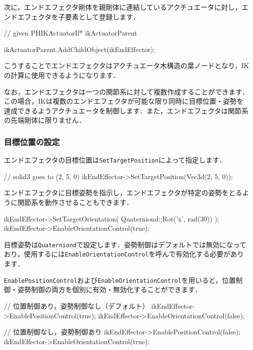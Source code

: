 \KLUDGE 次に，エンドエフェクタ剛体を親剛体に連結しているアクチュエータに対し，エンドエフェクタを子要素として登録します．
\begin{sourcecode}
// given PHIKActuatorIf* ikActuatorParent

ikActuatorParent.AddChildObject(ikEndEffector);
\end{sourcecode}
\KLUDGE こうすることでエンドエフェクタはアクチュエータ木構造の葉ノードとなり，IKの計算に使用できるようになります．

\KLUDGE なお，エンドエフェクタは一つの関節系に対して複数作成することができます．この場合，IKは複数のエンドエフェクタが可能な限り同時に目標位置・姿勢を達成できるようアクチュエータを制御します．また，エンドエフェクタは関節系の先端剛体に限りません．


\KLUDGE %
\KLUDGE %
\subsubsection*{目標位置の設定}

\KLUDGE エンドエフェクタの目標位置は\texttt{SetTargetPosition}によって指定します．
\begin{sourcecode}
// solid3 goes to (2, 5, 0)
ikEndEffector->SetTargetPosition(Vec3d(2, 5, 0)); 
\end{sourcecode}

\KLUDGE エンドエフェクタに目標姿勢を指示し，エンドエフェクタが特定の姿勢をとるように関節系を動作させることもできます．
\begin{sourcecode}
ikEndEffector->SetTargetOrientation( Quaterniond::Rot('x', rad(30)) ); 
ikEndEffector->EnableOrientationControl(true);
\end{sourcecode}
\KLUDGE 目標姿勢は\texttt{Quaterniond}で設定します．姿勢制御はデフォルトでは無効になっており，使用するには\texttt{EnableOrientationControl}を呼んで有効化する必要があります．

\texttt{EnablePositionControl}および\texttt{EnableOrientationControl}を用いると，位置制御・姿勢制御の両方を個別に有効・無効化することができます．
\begin{sourcecode}
// 位置制御あり，姿勢制御なし（デフォルト）
ikEndEffector->EnablePositionControl(true);
ikEndEffector->EnableOrientationControl(false);
\end{sourcecode}

\begin{sourcecode}
// 位置制御なし，姿勢制御あり
ikEndEffector->EnablePositionControl(false);
ikEndEffector->EnableOrientationControl(true);
\end{sourcecode}


